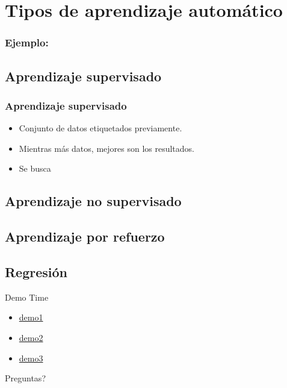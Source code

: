 \documentclass[10pt]{beamer}
\begin{document}
\section{Tipos de aprendizaje automático}
\begin{frame}
  \frametitle{Ejemplo:}


\end{frame}
\subsection{Aprendizaje supervisado}
\begin{frame}
  \frametitle{Aprendizaje supervisado}
  \begin{itemize}
    \item Conjunto de datos etiquetados previamente.
    \item Mientras más datos, mejores son los resultados.
    \item Se busca
  \end{itemize}

\end{frame}
\subsection{Aprendizaje no supervisado}
\subsection{Aprendizaje por refuerzo}
\subsection{Regresión}


{
\begin{frame}[standout]
  Demo Time
  \begin{itemize}
    \item \href{http://math.hws.edu/eck/jsdemo/jsGeneticAlgorithm.html}{demo1}
    \item \href{https://rednuht.org/genetic_walkers/}{demo2}
    \item \href{https://rednuht.org/genetic_cars_2/}{demo3}
  \end{itemize}
\end{frame}
}

{
\begin{frame}[standout]
  Preguntas?
\end{frame}
}

\appendix
\end{document}
